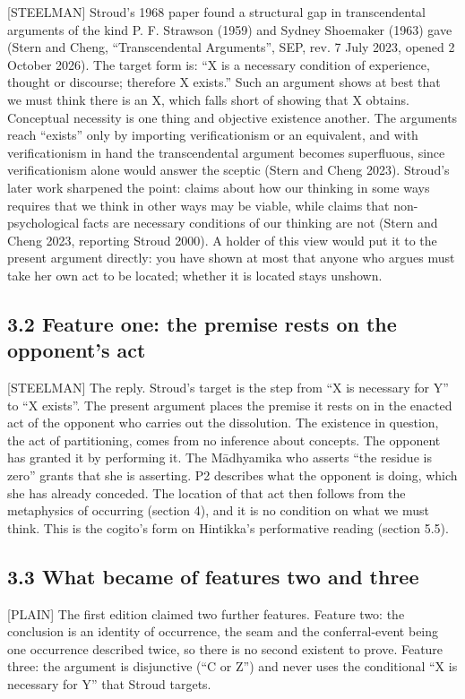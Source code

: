 \documentclass[11pt]{article}
\newcommand{\register}[1]{{\ttfamily\small #1}}
\begin{document}
\register{[STEELMAN]} Stroud's 1968 paper found a structural gap in transcendental arguments of the kind P. F. Strawson (1959) and Sydney Shoemaker (1963) gave (Stern and Cheng, ``Transcendental Arguments'', SEP, rev. 7 July 2023, opened 2 October 2026). The target form is: ``X is a necessary condition of experience, thought or discourse; therefore X exists.'' Such an argument shows at best that we must think there is an X, which falls short of showing that X obtains. Conceptual necessity is one thing and objective existence another. The arguments reach ``exists'' only by importing verificationism or an equivalent, and with verificationism in hand the transcendental argument becomes superfluous, since verificationism alone would answer the sceptic (Stern and Cheng 2023). Stroud's later work sharpened the point: claims about how our thinking in some ways requires that we think in other ways may be viable, while claims that non-psychological facts are necessary conditions of our thinking are not (Stern and Cheng 2023, reporting Stroud 2000). A holder of this view would put it to the present argument directly: you have shown at most that anyone who argues must take her own act to be located; whether it is located stays unshown.

\subsection*{3.2 Feature one: the premise rests on the opponent's act}

\register{[STEELMAN]} The reply. Stroud's target is the step from ``X is necessary for Y'' to ``X exists''. The present argument places the premise it rests on in the enacted act of the opponent who carries out the dissolution. The existence in question, the act of partitioning, comes from no inference about concepts. The opponent has granted it by performing it. The Mādhyamika who asserts ``the residue is zero'' grants that she is asserting. P2 describes what the opponent is doing, which she has already conceded. The location of that act then follows from the metaphysics of occurring (section 4), and it is no condition on what we must think. This is the cogito's form on Hintikka's performative reading (section 5.5).

\subsection*{3.3 What became of features two and three}

\register{[PLAIN]} The first edition claimed two further features. Feature two: the conclusion is an identity of occurrence, the seam and the conferral-event being one occurrence described twice, so there is no second existent to prove. Feature three: the argument is disjunctive (``C or Z'') and never uses the conditional ``X is necessary for Y'' that Stroud targets.
\end{document}
